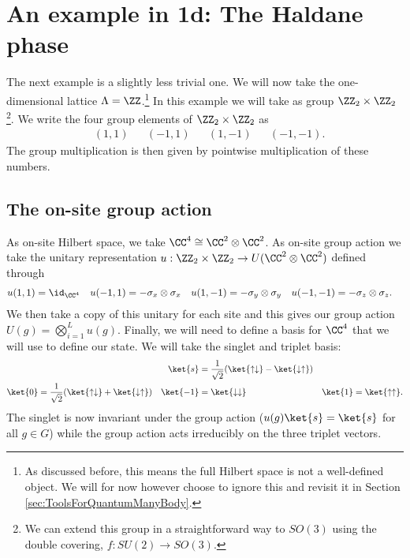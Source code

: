\section{An example in 1d: The Haldane phase}\label{sec:an-example-in-1d-the-haldane-phase}
The next example is a slightly less trivial one. We will now take the one-dimensional lattice $\Lambda=\ZZ$.\footnote{As discussed before, this means the full Hilbert space is not a well-defined object. We will for now however choose to ignore this and revisit it in Section \ref{sec:ToolsForQuantumManyBody}.} In this example we will take as group $\ZZ_2\times\ZZ_2$\footnote{We can extend this group in a straightforward way to $SO(3)$ using the double covering, $f:SU(2)\rightarrow SO(3)$.}. We write the four group elements of $\ZZ_2\times\ZZ_2$ as
\begin{align}
&(1,1)&&(-1,1)&&(1,-1)&&(-1,-1).
\end{align}
The group multiplication is then given by pointwise multiplication of these numbers.
\subsection{The on-site group action}
As on-site Hilbert space, we take $\CC^4\cong \CC^2\otimes\CC^2$. As on-site group action we take the unitary representation $u:\ZZ_2\times\ZZ_2\rightarrow U(\CC^2\otimes\CC^2)$ defined through
\begin{align}\label{eq:OnSiteActionOfFakeAKLT_Model}
u(1,1)&=\id_{\CC^4}&u(-1,1)&=-\sigma_x\otimes\sigma_x&u(1,-1)&=-\sigma_y\otimes\sigma_y&u(-1,-1)&=-\sigma_z\otimes\sigma_z.
\end{align}
We then take a copy of this unitary for each site and this gives our group action $U(g)=\bigotimes_{i=1}^{L}u(g)$. Finally, we will need to define a basis for $\CC^4$ that we will use to define our state. We will take the singlet and triplet basis:
\begin{align}
&&\ket{s}&=\frac{1}{\sqrt{2}}(\ket{\uparrow\downarrow}-\ket{\downarrow\uparrow})&&\\
\ket{0}&=\frac{1}{\sqrt{2}}(\ket{\uparrow\downarrow}+\ket{\downarrow\uparrow})&\ket{-1}&=\ket{\downarrow\downarrow}&\ket{1}&=\ket{\uparrow\uparrow}.
\end{align}
The singlet is now invariant under the group action ($u(g)\ket{s}=\ket{s}$ for all $g\in G$) while the group action acts irreducibly on the three triplet vectors.
